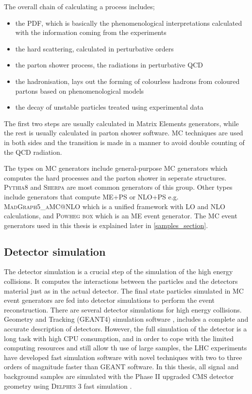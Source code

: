 The overall chain of calculating a process includes;
\begin{itemize}
    \item the PDF, which is basically the phenomenological interpretations calculated with the information coming from the experiments
    \item the hard scattering, calculated in perturbative orders
    \item the parton shower process, the radiations in perturbative QCD
    \item the hadronisation, lays out the forming of colourless hadrons from coloured partons based on phenomenological models
    \item the decay of unstable particles treated using experimental data
\end{itemize}
The first two steps are usually calculated in Matrix Elements generators, while the rest is usually calculated in parton shower software. MC techniques are used in both sides and the transition is made in a manner to avoid double counting of the QCD radiation.

The types on MC generators include general-purpose MC generators which computes the hard processes and the parton shower in seperate structures. \textsc{Pythia8} and \textsc{Sherpa} are most common generators of this group. Other types include generators that compute ME+PS or NLO+PS e.g. \textsc{MadGraph5\_aMC@NLO} which is a unified framework with LO and NLO calculations, and \textsc{Powheg box} which is an ME event generator. The MC event generators used in this thesis is explained later in \autoref{samples_section}.

\subsection{Detector simulation}\label{detector_sim_subsection}

The detector simulation is a crucial step of the simulation of the high energy collisions. It computes the interactions between the particles and the detectors material just as in the actual detector. The final state particles simulated in MC event generators are fed into detector simulations to perform the event reconstruction. There are several detector simulations for high energy collisions. Geometry and Tracking (GEANT4) simulation software \cite{Agostinelli2003}, includes a complete and accurate description of detectors. However, the full simulation of the detector is a long task with high CPU consumption, and in order to cope with the limited computing resources and still allow th use of large samples, the LHC experiments have developed fast simulation software with novel techniques \cite{Sekmen:2242542, Lukas:2012kua} with two to three orders of magnitude faster than GEANT software. In this thesis, all signal and background samples are simulated with the Phase II upgraded CMS detector geometry using \textsc{Delphes} 3 fast simulation \cite{Selvaggi:2014mya}.

